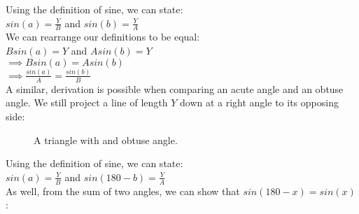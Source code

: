 Using the definition of sine, we can state:\\

\tab $sin(a) = \frac{Y}{B}$  and  $sin(b) = \frac{Y}{A}$\\

We can rearrange our definitions to be equal:\\

\tab $B sin(a) = Y$  and $A sin(b) = Y$ \\

\tab $\implies B sin(a) = A sin(b)$\\

\tab $\implies \frac{sin(a)}{A} = \frac{sin(b)}{B}$\\

A similar, derivation is possible when comparing an acute angle and an obtuse angle.  We still project a line of length $Y$ down at a right angle to its opposing side:\\

\begin{figure}[htb]
\center
\caption{A triangle with and obtuse angle.}
\label{fig:A triangle}
\end{figure}

Using the definition of sine, we can state:\\

\tab $sin(a) = \frac{Y}{B}$  and  $sin(180-b) = \frac{Y}{A}$\\

As well, from the sum of two angles, we can show that $sin(180-x) = sin(x)$:\\

